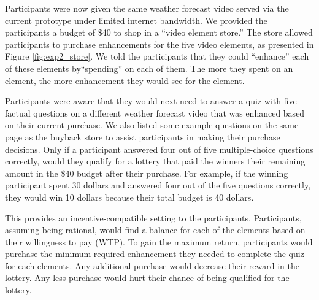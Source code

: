Participants were now given the same weather forecast video served via the current prototype under limited internet bandwidth. We provided the participants a budget of \$40 to shop in a ``video element store.'' The store allowed participants to purchase enhancements for the five video elements, as presented in Figure \ref{fig:exp2_store}. We told the participants that they could ``enhance'' each of these elements by``spending'' on each of them. The more they spent on an element, the more enhancement they would see for the element. 

Participants were aware that they would next need to answer a quiz with five factual questions on a different weather forecast video that was enhanced based on their current purchase. We also listed some example questions on the same page as the buyback store to assist participants in making their purchase decisions. Only if a participant answered four out of five multiple-choice questions correctly, would they qualify for a lottery that paid the winners their remaining amount in the \$40 budget after their purchase. For example, if the winning participant spent 30 dollars and answered four out of the five questions correctly, they would win 10 dollars because their total budget is 40 dollars. 

This provides an incentive-compatible setting to the participants. Participants, assuming being rational, would find a balance for each of the elements based on their willingness to pay (WTP). To gain the maximum return, participants would purchase the minimum required enhancement they needed to complete the quiz for each elements. Any additional purchase would decrease their reward in the lottery. Any less purchase would hurt their chance of being qualified for the lottery.

